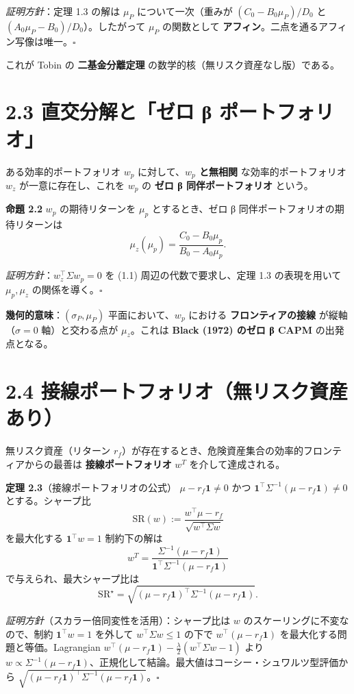 \documentclass[11pt,a4paper]{report}
\begin{document}
\emph{証明方針}：定理 1.3 の解は $\mu_P$ について一次（重みが $(C_0 - B_0\mu_P)/D_0$ と $(A_0\mu_P - B_0)/D_0$）。したがって $\mu_P$ の関数として \textbf{アフィン}。二点を通るアフィン写像は唯一。$\square$

これが Tobin の \textbf{二基金分離定理} の数学的核（無リスク資産なし版）である。

\section{2.3 直交分解と「ゼロ β ポートフォリオ」}

ある効率的ポートフォリオ $w_p$ に対して、\textbf{$w_p$ と無相関} な効率的ポートフォリオ $w_z$ が一意に存在し、これを $w_p$ の \textbf{ゼロ β 同伴ポートフォリオ} という。

\textbf{命題 2.2} $w_p$ の期待リターンを $\mu_p$ とするとき、ゼロ β 同伴ポートフォリオの期待リターンは \[ \mu_z(\mu_p) = \frac{C_0 - B_0 \mu_p}{B_0 - A_0 \mu_p}. \]

\emph{証明方針}：$w_z^\top \Sigma w_p = 0$ を (1.1) 周辺の代数で要求し、定理 1.3 の表現を用いて $\mu_p, \mu_z$ の関係を導く。$\square$

\textbf{幾何的意味}：$(\sigma_P, \mu_P)$ 平面において、$w_p$ における \textbf{フロンティアの接線} が縦軸（$\sigma = 0$ 軸）と交わる点が $\mu_z$。これは \textbf{Black (1972) のゼロ β CAPM} の出発点となる。

\section{2.4 接線ポートフォリオ（無リスク資産あり）}

無リスク資産（リターン $r_f$）が存在するとき、危険資産集合の効率的フロンティアからの最善は \textbf{接線ポートフォリオ} $w^T$ を介して達成される。

\textbf{定理 2.3}（接線ポートフォリオの公式） $\mu - r_f \mathbf{1} \neq 0$ かつ $\mathbf{1}^\top \Sigma^{-1}(\mu - r_f \mathbf{1}) \neq 0$ とする。シャープ比 \[ \mathrm{SR}(w) := \frac{w^\top \mu - r_f}{\sqrt{w^\top \Sigma w}} \] を最大化する $\mathbf{1}^\top w = 1$ 制約下の解は \[ \boxed{\; w^T = \frac{\Sigma^{-1}(\mu - r_f \mathbf{1})}{\mathbf{1}^\top \Sigma^{-1}(\mu - r_f \mathbf{1})} \;} \] で与えられ、最大シャープ比は \[ \mathrm{SR}^\star = \sqrt{(\mu - r_f\mathbf{1})^\top \Sigma^{-1} (\mu - r_f\mathbf{1})}. \]

\emph{証明方針}（スカラー倍同変性を活用）：シャープ比は $w$ のスケーリングに不変なので、制約 $\mathbf{1}^\top w = 1$ を外して $w^\top\Sigma w \le 1$ の下で $w^\top(\mu - r_f \mathbf{1})$ を最大化する問題と等価。Lagrangian $w^\top(\mu - r_f\mathbf{1}) - \tfrac{\lambda}{2}(w^\top \Sigma w - 1)$ より $w \propto \Sigma^{-1}(\mu - r_f\mathbf{1})$、正規化して結論。最大値はコーシー・シュワルツ型評価から $\sqrt{(\mu-r_f\mathbf{1})^\top \Sigma^{-1}(\mu-r_f\mathbf{1})}$。$\square$
\end{document}
